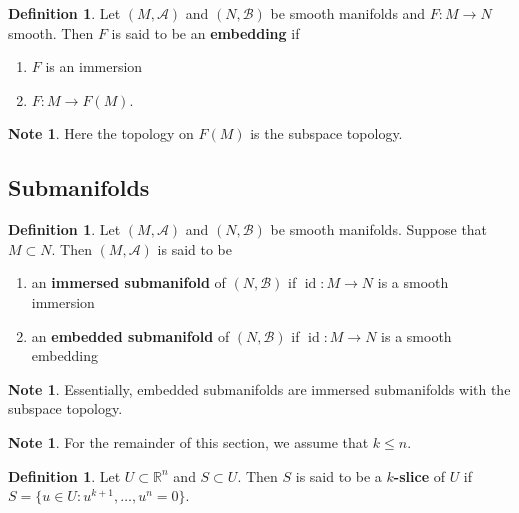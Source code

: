 \documentclass[12pt]{amsart}
\theoremstyle{definition}
\newtheorem{defn}[definition]{Definition}
\newtheorem{note}[definition]{Note}
\newcommand{\R}{\mathbb{R}}
\newcommand{\MA}{\mathcal{A}}
\newcommand{\MB}{\mathcal{B}}
\DeclareMathOperator{\id}{id}
\begin{document}
	\begin{defn}
	Let $(M, \MA)$ and $(N, \MB)$ be smooth manifolds and $F:M \rightarrow N$ smooth. Then $F$ is said to be an \textbf{embedding} if 
	\begin{enumerate}
	\item $F$ is an immersion
	\item $F:M \rightarrow F(M)$. 
\end{enumerate}	 
	\end{defn}	

	\begin{note}
	Here the topology on $F(M)$ is the subspace topology.
	\end{note}
	

	
	
	
	
	
	
	
	
	
	
	\newpage
	\subsection{Submanifolds}
	

	\begin{defn}
		Let $(M, \MA)$ and  $(N, \MB)$ be smooth manifolds. Suppose that $M \subset N$. Then $(M, \MA)$ is said to be 
		\begin{enumerate}
		\item an \textbf{immersed submanifold} of $(N, \MB)$ if $\id:M \rightarrow N$ is a smooth immersion
		\item an \textbf{embedded submanifold} of $(N, \MB)$ if $\id:M \rightarrow N$ is a smooth embedding
		\end{enumerate}
	\end{defn}
	
	\begin{note}
	Essentially, embedded submanifolds are immersed submanifolds with the subspace topology.
	\end{note}
	
	\begin{note}
	For the remainder of this section, we assume that $k \leq n$.
	\end{note}
	
	\begin{defn}
	Let $U \subset \R^n$ and $S \subset U$. Then $S$ is said to be a \textbf{$k$-slice} of $U$ if $S = \{u \in U: u^{k+1}, \dots, u^{n} = 0\}$.
	\end{defn}	
	
\end{document}
